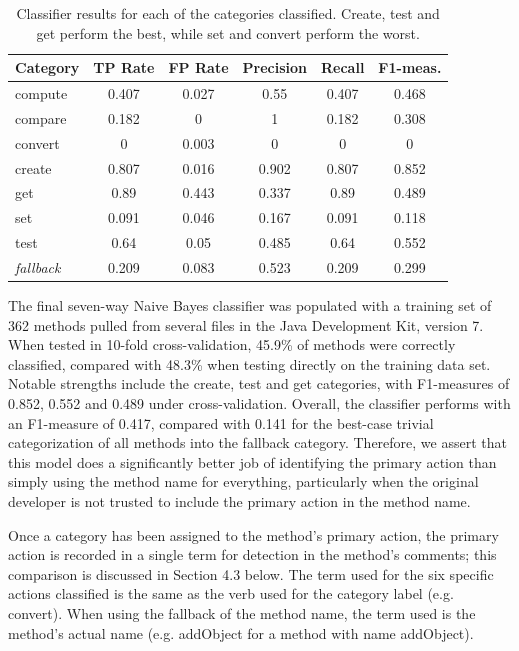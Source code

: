 \documentclass[preprint]{sigplanconf}
\begin{document}
\begin{table}
	\begin{center}
		\begin{tabular}{ l | c | c | c | c | c }
		Category & TP Rate & FP Rate & Precision & Recall & F1-meas. \\
		\hline
		compute & 0.407 & 0.027 & 0.55 & 0.407 & 0.468 \\
		compare & 0.182 & 0 & 1 & 0.182 & 0.308 \\
		convert & 0 & 0.003 & 0 & 0 & 0 \\
		create & 0.807 & 0.016 & 0.902 & 0.807 & 0.852 \\
		get & 0.89 & 0.443 & 0.337 & 0.89 & 0.489 \\
		set & 0.091 & 0.046 & 0.167 & 0.091 & 0.118 \\
		test & 0.64 & 0.05 & 0.485 & 0.64 & 0.552 \\
		\emph{fallback} & 0.209 & 0.083 & 0.523 & 0.209 & 0.299
		\end{tabular}
	\end{center}
	\caption{Classifier results for each of the categories classified. Create, test and get perform the best, while set and convert perform the worst.}
	\label{table-classifier}
\end{table}

The final seven-way Naive Bayes classifier was populated with a training set of 362 methods pulled from several files in the Java Development Kit, version 7. When tested in 10-fold cross-validation, 45.9\% of methods were correctly classified, compared with 48.3\% when testing directly on the training data set. Notable strengths include the create, test and get categories, with F1-measures of 0.852, 0.552 and 0.489 under cross-validation. Overall, the classifier performs with an F1-measure of 0.417, compared with 0.141 for the best-case trivial categorization of all methods into the fallback category. Therefore, we assert that this model does a significantly better job of identifying the primary action than simply using the method name for everything, particularly when the original developer is not trusted to include the primary action in the method name.

Once a category has been assigned to the method's primary action, the primary action is recorded in a single term for detection in the method's comments; this comparison is discussed in Section 4.3 below. The term used for the six specific actions classified is the same as the verb used for the category label (e.g. convert). When using the fallback of the method name, the term used is the method's actual name (e.g. addObject for a method with name addObject).
\end{document}
